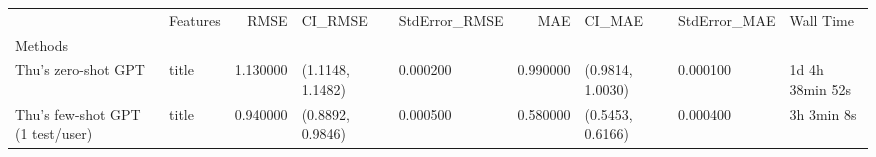 \begin{tabular}{llrllrlll}
 & Features & RMSE & CI_RMSE & StdError_RMSE & MAE & CI_MAE & StdError_MAE & Wall Time \\
Methods &  &  &  &  &  &  &  &  \\
Thu's zero-shot GPT & title & 1.130000 & (1.1148, 1.1482) & 0.000200 & 0.990000 & (0.9814, 1.0030) & 0.000100 & 1d 4h 38min 52s \\
Thu's few-shot GPT (1 test/user) & title & 0.940000 & (0.8892, 0.9846) & 0.000500 & 0.580000 & (0.5453, 0.6166) & 0.000400 & 3h 3min 8s \\
\end{tabular}
